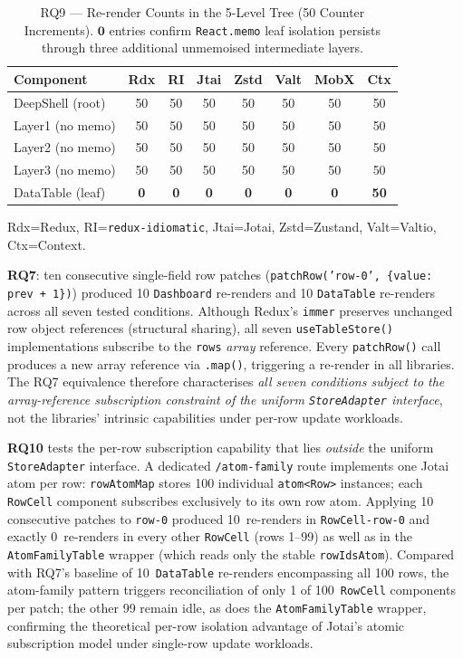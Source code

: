 \documentclass[conference]{IEEEtran}
\newcommand{\code}[1]{\texttt{\small #1}}
\begin{document}
\begin{table}[tb]
\caption{RQ9 --- Re-render Counts in the 5-Level Tree (50 Counter Increments).
  $\mathbf{0}$ entries confirm \code{React.memo} leaf isolation persists
  through three additional unmemoised intermediate layers.}
\label{tab:deep}
\begin{center}
\scriptsize
\setlength{\tabcolsep}{2pt}
\begin{tabular}{lccccccc}
\toprule
\textbf{Component} & \textbf{Rdx} & \textbf{RI} & \textbf{Jtai}
  & \textbf{Zstd} & \textbf{Valt} & \textbf{MobX} & \textbf{Ctx} \\
\midrule
DeepShell (root)  & 50 & 50 & 50 & 50 & 50 & 50 & 50 \\
Layer1 (no memo)  & 50 & 50 & 50 & 50 & 50 & 50 & 50 \\
Layer2 (no memo)  & 50 & 50 & 50 & 50 & 50 & 50 & 50 \\
Layer3 (no memo)  & 50 & 50 & 50 & 50 & 50 & 50 & 50 \\
DataTable (leaf)  & \textbf{0} & \textbf{0} & \textbf{0} & \textbf{0}
                  & \textbf{0} & \textbf{0} & \textbf{50} \\
\bottomrule
\end{tabular}
\end{center}
\parbox{\columnwidth}{\scriptsize
  Rdx=Redux, RI=\code{redux-idiomatic}, Jtai=Jotai, Zstd=Zustand,
  Valt=Valtio, Ctx=Context.}
\end{table}

\textbf{RQ7}: ten consecutive single-field row patches
(\code{patchRow('row-0', \{value: prev + 1\})}) produced 10
\code{Dashboard} re-renders and 10 \code{DataTable} re-renders across
all seven tested conditions. Although Redux's \code{immer} preserves
unchanged row object references (structural sharing), all seven
\code{useTableStore()} implementations subscribe to the \code{rows}
\emph{array} reference.
Every \code{patchRow()} call produces a new array reference via
\code{.map()}, triggering a re-render in all libraries. The RQ7
equivalence therefore characterises
\emph{all seven conditions subject to
the array-reference subscription constraint of the uniform
\code{StoreAdapter} interface}, not the libraries' intrinsic
capabilities under per-row update workloads.

\textbf{RQ10} tests the per-row subscription capability that lies
\emph{outside} the uniform \code{StoreAdapter} interface.  A dedicated
\code{/atom-family} route implements one Jotai atom per row:
\code{rowAtomMap} stores 100 individual \code{atom<Row>} instances;
each \code{RowCell} component subscribes exclusively to its own row
atom.  Applying 10 consecutive patches to \code{row-0} produced
10~re-renders in \code{RowCell-row-0} and exactly 0~re-renders in
every other \code{RowCell} (rows 1--99) as well as in the
\code{AtomFamilyTable} wrapper (which reads only the stable
\code{rowIdsAtom}).  Compared with RQ7's baseline of 10~\code{DataTable}
re-renders encompassing all 100 rows, the atom-family pattern
triggers reconciliation of only 1 of 100~\code{RowCell} components
per patch; the other 99 remain idle, as does the
\code{AtomFamilyTable} wrapper, confirming the theoretical per-row isolation
advantage of Jotai's atomic subscription model under single-row
update workloads.
\end{document}
